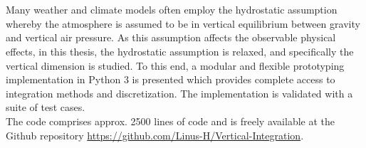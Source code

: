 \chapter{\abstractname}
Many weather and climate models often employ the hydrostatic assumption whereby the atmosphere is assumed to be in vertical equilibrium between gravity and vertical air pressure. 
As this assumption affects the observable physical effects, in this thesis, the hydrostatic assumption is relaxed, and specifically the vertical dimension is studied.
To this end, a modular and flexible prototyping implementation in Python 3 is presented which provides complete access to integration methods and discretization.
The implementation is validated with a suite of test cases.\\
The code comprises approx. 2500 lines of code and is freely available at the Github repository \url{https://github.com/Linus-H/Vertical-Integration}.